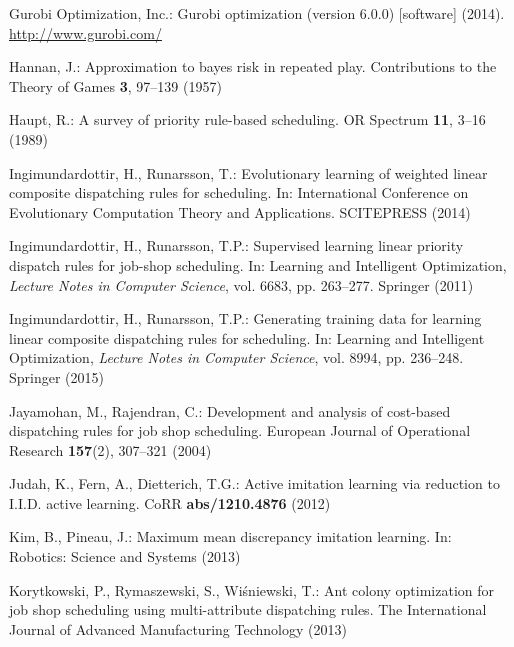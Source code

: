 \documentclass[twocolumn]{svjour3}
\begin{document}
\begin{thebibliography}{10}
    {Gurobi Optimization, Inc.}: Gurobi optimization (version 6.0.0) [software]
    (2014).
    \newblock \urlprefix\url{http://www.gurobi.com/}
    
    Hannan, J.: Approximation to bayes risk in repeated play.
    \newblock Contributions to the Theory of Games \textbf{3}, 97--139 (1957)
    
    Haupt, R.: A survey of priority rule-based scheduling.
    \newblock OR Spectrum \textbf{11}, 3--16 (1989)
    
    Ingimundardottir, H., Runarsson, T.: Evolutionary learning of weighted 
    linear
    composite dispatching rules for scheduling.
    \newblock In: International Conference on Evolutionary Computation Theory 
    and
    Applications. SCITEPRESS (2014)
    
    Ingimundardottir, H., Runarsson, T.P.: Supervised learning linear priority
    dispatch rules for job-shop scheduling.
    \newblock In: Learning and Intelligent Optimization, \emph{Lecture Notes in
        Computer Science}, vol. 6683, pp. 263--277. Springer (2011)
    
    Ingimundardottir, H., Runarsson, T.P.: Generating training data for learning
    linear composite dispatching rules for scheduling.
    \newblock In: Learning and Intelligent Optimization, \emph{Lecture Notes in
        Computer Science}, vol. 8994, pp. 236--248. Springer (2015)
    
    Jayamohan, M., Rajendran, C.: Development and analysis of cost-based
    dispatching rules for job shop scheduling.
    \newblock European Journal of Operational Research \textbf{157}(2), 307--321
    (2004)
    
    Judah, K., Fern, A., Dietterich, T.G.: Active imitation learning via 
    reduction
    to {I.I.D.} active learning.
    \newblock CoRR \textbf{abs/1210.4876} (2012)
    
    Kim, B., Pineau, J.: Maximum mean discrepancy imitation learning.
    \newblock In: Robotics: Science and Systems (2013)
    
    Korytkowski, P., Rymaszewski, S., Wi\'{s}niewski, T.: {Ant colony 
    optimization
        for job shop scheduling using multi-attribute dispatching rules}.
    \newblock The International Journal of Advanced Manufacturing Technology
    (2013)
    

\end{thebibliography}
\end{document}
